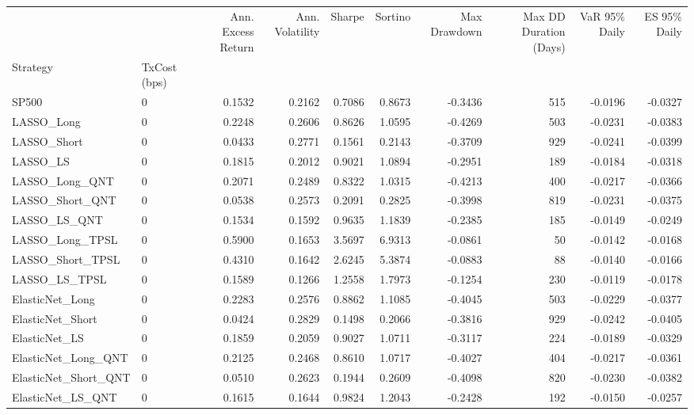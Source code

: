 \begin{tabular}{llrrrrrrrr}
\toprule
 &  & Ann. Excess Return & Ann. Volatility & Sharpe & Sortino & Max Drawdown & Max DD Duration (Days) & VaR 95\% Daily & ES 95\% Daily \\
Strategy & TxCost (bps) &  &  &  &  &  &  &  &  \\
\midrule
SP500 & 0 & 0.1532 & 0.2162 & 0.7086 & 0.8673 & -0.3436 & 515 & -0.0196 & -0.0327 \\
\cline{1-10}
LASSO\_Long & 0 & 0.2248 & 0.2606 & 0.8626 & 1.0595 & -0.4269 & 503 & -0.0231 & -0.0383 \\
\cline{1-10}
LASSO\_Short & 0 & 0.0433 & 0.2771 & 0.1561 & 0.2143 & -0.3709 & 929 & -0.0241 & -0.0399 \\
\cline{1-10}
LASSO\_LS & 0 & 0.1815 & 0.2012 & 0.9021 & 1.0894 & -0.2951 & 189 & -0.0184 & -0.0318 \\
\cline{1-10}
LASSO\_Long\_QNT & 0 & 0.2071 & 0.2489 & 0.8322 & 1.0315 & -0.4213 & 400 & -0.0217 & -0.0366 \\
\cline{1-10}
LASSO\_Short\_QNT & 0 & 0.0538 & 0.2573 & 0.2091 & 0.2825 & -0.3998 & 819 & -0.0231 & -0.0375 \\
\cline{1-10}
LASSO\_LS\_QNT & 0 & 0.1534 & 0.1592 & 0.9635 & 1.1839 & -0.2385 & 185 & -0.0149 & -0.0249 \\
\cline{1-10}
LASSO\_Long\_TPSL & 0 & 0.5900 & 0.1653 & 3.5697 & 6.9313 & -0.0861 & 50 & -0.0142 & -0.0168 \\
\cline{1-10}
LASSO\_Short\_TPSL & 0 & 0.4310 & 0.1642 & 2.6245 & 5.3874 & -0.0883 & 88 & -0.0140 & -0.0166 \\
\cline{1-10}
LASSO\_LS\_TPSL & 0 & 0.1589 & 0.1266 & 1.2558 & 1.7973 & -0.1254 & 230 & -0.0119 & -0.0178 \\
\cline{1-10}
ElasticNet\_Long & 0 & 0.2283 & 0.2576 & 0.8862 & 1.1085 & -0.4045 & 503 & -0.0229 & -0.0377 \\
\cline{1-10}
ElasticNet\_Short & 0 & 0.0424 & 0.2829 & 0.1498 & 0.2066 & -0.3816 & 929 & -0.0242 & -0.0405 \\
\cline{1-10}
ElasticNet\_LS & 0 & 0.1859 & 0.2059 & 0.9027 & 1.0711 & -0.3117 & 224 & -0.0189 & -0.0329 \\
\cline{1-10}
ElasticNet\_Long\_QNT & 0 & 0.2125 & 0.2468 & 0.8610 & 1.0717 & -0.4027 & 404 & -0.0217 & -0.0361 \\
\cline{1-10}
ElasticNet\_Short\_QNT & 0 & 0.0510 & 0.2623 & 0.1944 & 0.2609 & -0.4098 & 820 & -0.0230 & -0.0382 \\
\cline{1-10}
ElasticNet\_LS\_QNT & 0 & 0.1615 & 0.1644 & 0.9824 & 1.2043 & -0.2428 & 192 & -0.0150 & -0.0257 \\

\end{tabular}
